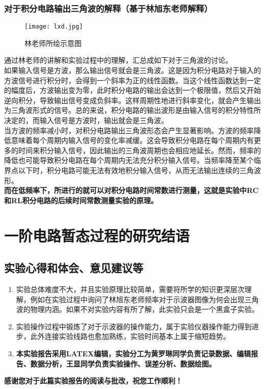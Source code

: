 \documentclass[dvipsnames, svgnames,a4paper,11pt]{article}
\begin{document}
	\subsubsection{对于积分电路输出三角波的解释（基于林旭东老师解释）}
	\begin{figure}[{H}]
		\centering
		\texttt{[image: lxd.jpg]}
		\caption{林老师所绘示意图}
		\label{}
	\end{figure}
	通过林老师的讲解和实验过程中的理解，汇总成如下对于三角波的讨论。\\
	\indent 如果输入信号是方波，那么输出信号就会是三角波。这是因为积分电路对于输入的方波信号进行积分时，会得到一个斜率为正的线性函数。当这个线性函数达到一定的幅度后，方波输出变为零，此时积分电路的输出会达到一个极限值，然后又开始逆向积分，导致输出信号变成负斜率。这样周期性地进行斜率变化，就会产生输出为三角波形式的信号。总的来说，积分电路的输出波形是由输入信号的积分特性所决定的，而输入信号是方波时，输出就会是三角波。\\
	\indent 当方波的频率减小时，对积分电路输出三角波形态会产生显著影响。方波的频率降低意味着每个周期内输入信号的变化率减缓。这会导致积分电路在每个周期内有更多的时间来积分输入信号，因此输出的三角波周期也会相应地延长。然而，频率的降低也可能导致积分电路在每个周期内无法充分积分输入信号。当频率降至某个临界点以下时，积分电路可能无法有效地积分输入信号，从而无法输出连续的三角波形。\\
	\indent \textbf{而在低频率下，所进行的就可以对积分电路时间常数进行测量，这就是实验中RC和RL积分电路的后续时间常数测量实验的原理。}
	
	
	\clearpage
	
	\section{一阶电路暂态过程的研究\quad\heiti 结语}
	
	\subsection{实验心得和体会、意见建议等}
	\begin{enumerate}
		\item 实验总体难度不大，并且实验原理比较简单，需要将所学的知识更深层次理解，例如在实验过程中询问了林旭东老师频率对于示波器图像为何会出现三角波的物理内涵。如果不对实验内容有所了解，此实验只会是一个黑盒子实验。
		\item 实验操作过程中锻炼了对于示波器的操作能力，属于实验仪器操作能力得到进步，此外连接实验线路也愈加熟练，实验时间基本上属于缩短趋势。
		\item \textbf{本实验报告采用LATEX编辑，实验分工为黄罗琳同学负责记录数据、编辑报告、数据分析，王显同学负责实验操作、误差分析、数据绘图。}
		
	\end{enumerate}
	 \quad \large \textbf{感谢您对于此篇实验报告的阅读与批改，祝您工作顺利！}
	
\end{document}
